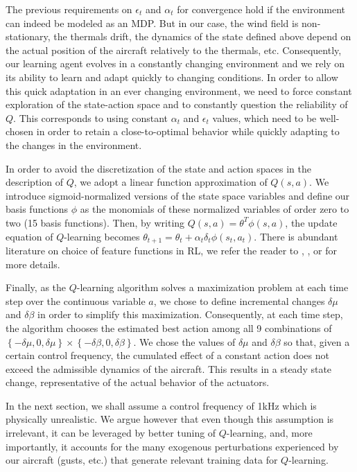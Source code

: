 \documentclass{ifacconf}
\begin{document}
The previous requirements on $\epsilon_t$ and $\alpha_t$ for convergence hold if the environment can indeed be modeled as an MDP. But in our case, the wind field is non-stationary, the thermals drift, the dynamics of the state defined above depend on the actual position of the aircraft relatively to the thermals, etc. Consequently, our learning agent evolves in a constantly changing environment and we rely on its ability to learn and adapt quickly to changing conditions. In order to allow this quick adaptation in an ever changing environment, we need to force constant exploration of the state-action space and to constantly question the reliability of $Q$. This corresponds to using constant $\alpha_t$ and $\epsilon_t$ values, which need to be well-chosen in order to retain a close-to-optimal behavior while quickly adapting to the changes in the environment.

In order to avoid the discretization of the state and action spaces in the description of $Q$, we adopt a linear function approximation of $Q(s,a)$. We introduce sigmoid-normalized versions of the state space variables and define our basis functions $\phi$ as the monomials of these normalized variables of order zero to two (15 basis functions). Then, by writing $Q(s,a)=\theta^T \phi(s,a)$, the update equation of $Q$-learning becomes $\theta_{t+1}=\theta_t + \alpha_t\delta_t\phi(s_t,a_t)$. 
There is abundant literature on choice of feature functions in RL, we refer the reader to \cite{parr08}, \cite{hachiya10}, or \cite{nguyen13} for more details.

Finally, as the $Q$-learning algorithm solves a maximization problem at each time step over the continuous variable $a$, we chose to define incremental changes $\delta\mu$ and $\delta\beta$ in order to simplify this maximization. Consequently, at each time step, the algorithm chooses the estimated best action among all 9 combinations of $\left\{-\delta\mu,0,\delta\mu\right\}\times\left\{-\delta\beta,0,\delta\beta\right\}$. We chose the values of $\delta\mu$ and $\delta\beta$ so that, given a certain control frequency, the cumulated effect of a constant action does not exceed the admissible dynamics of the aircraft. This results in a steady state change, representative of the actual behavior of the actuators.

In the next section, we shall assume a control frequency of 1kHz which is physically unrealistic.
We argue however that even though this assumption is irrelevant, it can be leveraged by better tuning of $Q$-learning, and, more importantly, it accounts for the many exogenous perturbations experienced by our aircraft (gusts, etc.) that generate relevant training data for $Q$-learning.
\end{document}
